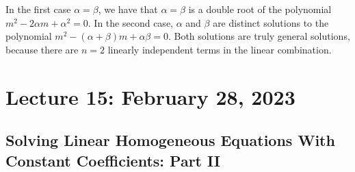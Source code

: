         In the first case \(\alpha=\beta\), we have that \(\alpha=\beta\) is a double root of the polynomial \(m^2-2\alpha m+\alpha^2=0\). In the second case, \(\alpha\) and \(\beta\) are distinct solutions to the polynomial \(m^2-(\alpha+\beta)m+\alpha\beta=0\). Both solutions are truly general solutions, because there are \(n=2\) linearly independent terms in the linear combination.  
        \pagebreak

\section{Lecture 15: February 28, 2023}

    \subsection{Solving Linear Homogeneous Equations With Constant Coefficients: Part II}

